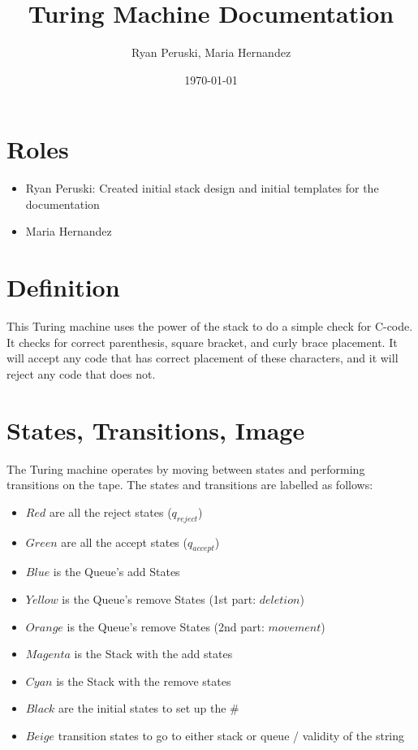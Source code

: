 \documentclass{article}
\title{Turing Machine Documentation}
\author{Ryan Peruski, Maria Hernandez}
\date{\today}
\begin{document}
\maketitle
\section{Roles}

\begin{itemize}
    \item Ryan Peruski: Created initial stack design and initial templates for the documentation
    \item Maria Hernandez
\end{itemize}
\section{Definition}
This Turing machine uses the power of the stack to do a simple check for C-code. It checks for correct parenthesis, square bracket, and curly brace
placement. It will accept any code that has correct placement of these characters, and it will reject any code that does not.

\section{States, Transitions, Image}
The Turing machine operates by moving between states and performing transitions on the tape. The states and transitions are labelled as follows:

\begin{itemize}
    \item $Red$ are all the reject states ($q_{reject}$)
    \item $Green$ are all the accept states ($q_{accept}$)
    \item $Blue$ is the Queue's add States
    \item $Yellow$ is the Queue's remove States (1st part: $deletion$)
    \item $Orange$ is the Queue's remove States  (2nd part: $movement$)
    \item $Magenta$ is the Stack with the add states
    \item $Cyan$ is the Stack with the remove states
    \item $Black$ are the initial states to set up the $\#$
    \item $Beige$ transition states to go to either stack or queue / validity of the string
\end{itemize}
\end{document}
